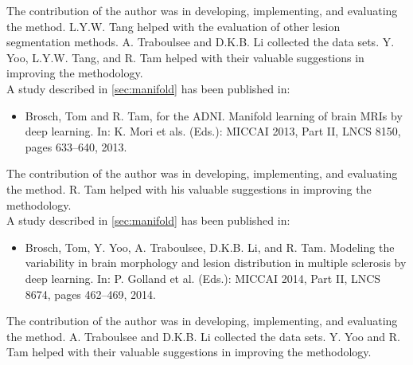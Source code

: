 The contribution of the author was in developing, implementing, and evaluating
the method. L.Y.W. Tang helped with the evaluation of other lesion segmentation
methods. A. Traboulsee and D.K.B. Li collected the data sets. Y. Yoo, L.Y.W.
Tang, and R. Tam helped with their valuable suggestions in improving the
methodology.
\\[1em]
A study described in \ref{sec:manifold} has been published in:
\begin{itemize}
\item Brosch, Tom and R. Tam, for the ADNI. Manifold learning of brain MRIs
by deep learning. In: K. Mori et als. (Eds.): MICCAI 2013, Part II, LNCS 8150,
pages 633--640, 2013.
\end{itemize}
The contribution of the author was in developing, implementing, and evaluating
the method. R. Tam helped with his valuable suggestions in improving the
methodology.
\\[1em]
A study described in \ref{sec:manifold} has been published in:
\begin{itemize}
\item Brosch, Tom, Y. Yoo, A. Traboulsee, D.K.B. Li, and R. Tam. Modeling the
variability in brain morphology and lesion distribution in multiple sclerosis by
deep learning. In: P. Golland et al. (Eds.): MICCAI 2014, Part II, LNCS 8674,
pages 462--469, 2014.
\end{itemize}
The contribution of the author was in developing, implementing, and evaluating
the method. A. Traboulsee and D.K.B. Li collected the data sets. Y. Yoo and R.
Tam helped with their valuable suggestions in improving the methodology.
